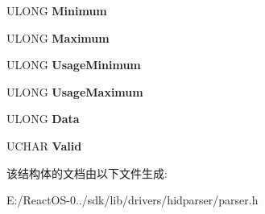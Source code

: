 \begin{DoxyCompactItemize}
U\+L\+O\+NG {\bfseries Minimum}
\item 
\mbox{\label{struct_h_i_d___r_e_p_o_r_t___i_t_e_m_accdb79e52d6525a05bfb76670cf4705c}} 
U\+L\+O\+NG {\bfseries Maximum}
\item 
\mbox{\label{struct_h_i_d___r_e_p_o_r_t___i_t_e_m_a27d8a38e2986ebbdb84c07e9ead3a285}} 
U\+L\+O\+NG {\bfseries Usage\+Minimum}
\item 
\mbox{\label{struct_h_i_d___r_e_p_o_r_t___i_t_e_m_ac3efb65ff1c0aaebcd3ef092c1f94b9b}} 
U\+L\+O\+NG {\bfseries Usage\+Maximum}
\item 
\mbox{\label{struct_h_i_d___r_e_p_o_r_t___i_t_e_m_a8a17766b6727f81d8a77c6606bb5223b}} 
U\+L\+O\+NG {\bfseries Data}
\item 
\mbox{\label{struct_h_i_d___r_e_p_o_r_t___i_t_e_m_a2d632797794cbead569803a9366bfc0f}} 
U\+C\+H\+AR {\bfseries Valid}
\end{DoxyCompactItemize}


该结构体的文档由以下文件生成\+:\begin{DoxyCompactItemize}
\item 
E\+:/\+React\+O\+S-\/0../sdk/lib/drivers/hidparser/parser.\+h\end{DoxyCompactItemize}
